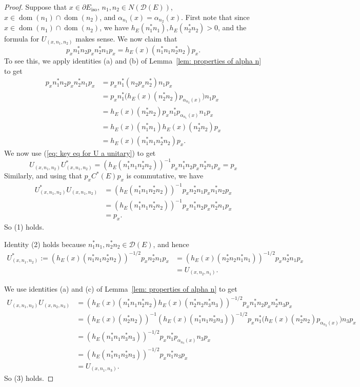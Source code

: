 \documentclass[12pt, a4paper]{amsart}
\numberwithin{equation}{section}
\theoremstyle{definition}
\theoremstyle{remark}
\begin{document}
\begin{proof}
Suppose that $x\in\partial 
E_{{\operatorname{iso}}}$, $n_1,n_2\in N(\mathcal{D}(E))$, $x\in{{\operatorname{dom}}}(n_1)\cap{{\operatorname{dom}}}(n_2)$, and 
$\alpha_{n_1}(x)=\alpha_{n_2}(x)$. First note that since 
$x\in{{\operatorname{dom}}}(n_1)\cap{{\operatorname{dom}}}(n_2)$, we have $h_E(n_1^*n_1),h_E(n_2^*n_2)>0$, and the 
formula for $U_{(x,n_1,n_2)}$ makes sense. We now claim that
\begin{equation}\label{eq: key eq for U a unitary}
p_xn_1^*n_2p_xn_2^*n_1p_x=h_E(x)(n_1^*n_1n_2^*n_2)p_x.
\end{equation}
To see this, we apply identities (a) and (b) of Lemma~\ref{lem: properties of 
alpha n} to get
\begin{align*}
p_xn_1^*n_2p_xn_2^*n_1p_x &= p_xn_1^*(n_2p_xn_2^*)n_1p_x\\
&= 
p_xn_1^*\big(h_E(x)(n_2^*n_2)p_{\alpha_{n_2}(x)}\big)n_1p_x\\
&= h_E(x)(n_2^*n_2)p_xn_1^*p_{\alpha_{n_1}(x)}n_1p_x\\
&= 
h_E(x)(n_1^*n_1)h_E(x)(n_2^*n_2)p_x\\
&= h_E(x)(n_1^*n_1n_2^*n_2)p_x.
\end{align*}
We now use (\ref{eq: key eq for U 
a unitary}) to get
\[
U_{(x,n_1,n_2)}U_{(x,n_1,n_2)}^*=(h_E(n_1^*n_1n_2^*n_2))^{-1}
p_xn_1^*n_2p_xn_2^*n_1p_x=p_x
\]
Similarly, and using that $p_xC^*(E)p_x$ is commutative, we have
\begin{align*}
U_{(x,n_1,n_2)}^*U_{(x,n_1,n_2)}
&=(h_E(n_1^*n_1n_2^*n_2))^{-1}p_xn_2^*n_1p_xn_1^*n_2p_x\\
&=(h_E(n_1^*n_1n_2^*n_2))^{-1}p_xn_1^*n_2p_xn_2^*n_1p_x\\
&=p_x.
\end{align*}
So (1) holds.

Identity (2) holds because $n_1^*n_1,n_2^*n_2\in{\mathcal{D}}(E)$, and hence
\begin{align*}
U_{(x,n_1,n_2)}^*:=(h_E(x)(n_1^*n_1n_2^*n_2))^{-1/2}p_xn_2^*n_1p_x&=
(h_E(x)(n_2^*n_2n_1^*n_1))^{-1/2}p_xn_2^*n_1p_x\\
&=U_{(x,n_2,n_1)}.
\end{align*}

We use identities (a) and (c) of Lemma~\ref{lem: properties of alpha n} to get
\begin{align*}
U_{(x,n_1,n_2)}U_{(x,n_2,n_3)}&=(h_E(x)(n_1^*n_1n_2^*n_2)h_E(x)(n_2^*n_2n_3^*n_3))^{-1/2}
p_xn_1^*n_2p_xn_2^*n_3p_x\\
&= (h_E(x)(n_2^*n_2))^{-1}(h_E(x)(n_1^*n_1n_3^*n_3))^{-1/2}p_xn_1^*
\big(h_E(x)(n_2^*n_2)
p_{\alpha_{n_2}(x)}\big)n_3p_x\\
&=(h_E(n_1^*n_1n_3^*n_3))^{-1/2}p_xn_1^*
p_{\alpha_{n_3}(x)}n_3p_x\\
&= (h_E(n_1^*n_1n_3^*n_3))^{-1/2}p_xn_1^*n_3p_x\\
&= U_{(x,n_1,n_3)}.
\end{align*}
So (3) holds. 
\end{proof}
\end{document}
